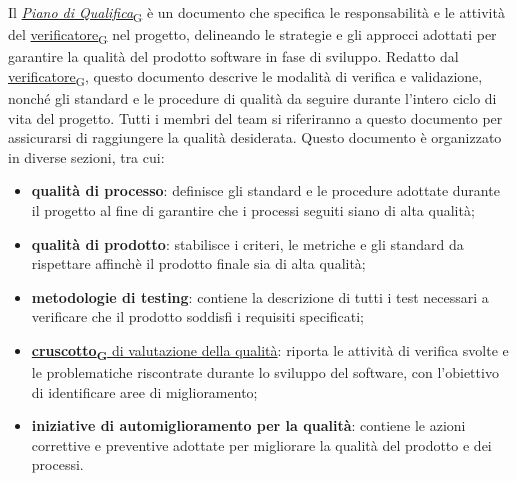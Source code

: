 Il \href{https://7last.github.io/docs/rtb/documentazione-interna/glossario\#piano-di-qualifica}{\textit{Piano di Qualifica}\textsubscript{G}} è un documento che specifica le responsabilità e le attività del \href{https://7last.github.io/docs/rtb/documentazione-interna/glossario\#verificatore}{verificatore\textsubscript{G}} nel progetto, delineando le strategie e gli approcci adottati per garantire la qualità del prodotto software in fase di sviluppo. Redatto dal \href{https://7last.github.io/docs/rtb/documentazione-interna/glossario\#verificatore}{verificatore\textsubscript{G}}, questo documento descrive le modalità di verifica e validazione, nonché gli standard e le procedure di qualità da seguire durante l'intero ciclo di vita del progetto. Tutti i membri del team si riferiranno a questo documento per assicurarsi di raggiungere la qualità desiderata. Questo documento è organizzato in diverse sezioni, tra cui:
\begin{itemize}
	\item \textbf{qualità di processo}: definisce gli standard e le procedure adottate durante il progetto al fine di garantire che i processi seguiti siano di alta qualità;
	\item \textbf{qualità di prodotto}: stabilisce i criteri, le metriche e gli standard da rispettare affinchè il prodotto finale sia di alta qualità;
	\item \textbf{metodologie di testing}: contiene la descrizione di tutti i test necessari a verificare che il prodotto soddisfi i requisiti specificati;
	\item \href{https://7last.github.io/docs/rtb/documentazione-interna/glossario\#cruscotto}{\textbf{cruscotto\textsubscript{G}} di valutazione della qualità}: riporta le attività di verifica svolte e le problematiche riscontrate durante lo sviluppo del software, con l'obiettivo di identificare aree di miglioramento;
	\item \textbf{iniziative di automiglioramento per la qualità}: contiene le azioni correttive e preventive adottate per migliorare la qualità del prodotto e dei processi.
\end{itemize}

